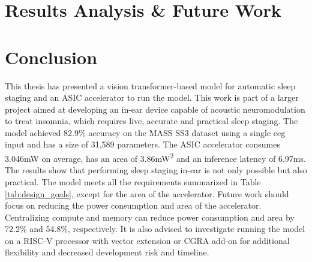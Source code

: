 \documentclass[12pt]{article}
\begin{document}
\newpage
\section{Results Analysis \& Future Work}


\newpage
\section{Conclusion}
\label{ref:conclusion}
This thesis has presented a vision transformer-based model for automatic sleep staging and an ASIC accelerator to run the model. This work is part of a larger project aimed at developing an 
in-ear device capable of acoustic neuromodulation to treat insomnia, which requires live, accurate and practical sleep staging. The model achieved 82.9\% accuracy on the MASS SS3 dataset using
a single \ac{eeg} input and has a size of 31,589 parameters. The ASIC accelerator consumes 3.046\si{\milli\watt} on average, has an area of 3.86\si{\square\milli\watt} and an inference latency
of 6.97ms. The results show that performing sleep staging in-ear is not only possible but also practical. The model meets all the requirements summarized in Table \ref{tab:design_goals}, except
for the area of the accelerator. Future work should focus on reducing the power consumption and area of the accelerator. Centralizing compute and memory can reduce power consumption and area by
72.2\% and 54.8\%, respectively. It is also advised to investigate running the model on a RISC-V processor with vector extension or CGRA add-on for additional flexibility and decreased development
risk and timeline.

\newpage

\AtNextBibliography{\footnotesize}
\printbibliography[heading=bibintoc]
\newpage





\newpage
\end{document}
